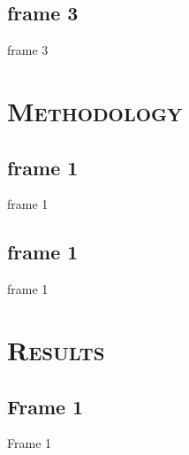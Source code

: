 \documentclass[xcolor=x11names,compress]{beamer}
\renewcommand{\(}{\begin{columns}}
\renewcommand{\)}{\end{columns}}
\newcommand{\<}[1]{\begin{column}{#1}}
\renewcommand{\>}{\end{column}}
\begin{document}
\subsection{frame 3}
\begin{frame}{frame 3}

\end{frame}


\section{\scshape Methodology}
\subsection{frame 1}
\begin{frame}{frame 1}

\end{frame}


\subsection{frame 1}
\begin{frame}{frame 1}

\end{frame}

\section{\scshape Results}
\subsection{Frame 1}
\begin{frame}{Frame 1}

\end{frame}
\end{document}
